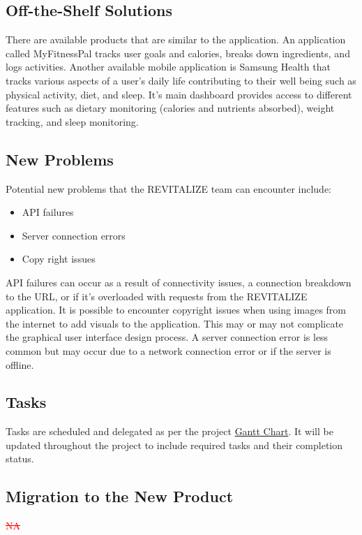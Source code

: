 \documentclass[12pt,letterpaper]{article}
\begin{document}
\subsection{Off-the-Shelf Solutions}
There are available products that are similar to the application. An application called MyFitnessPal tracks user goals and calories, breaks down ingredients, and logs activities. Another available mobile application is Samsung Health that tracks various aspects of a user's daily life contributing to their well being such as physical activity, diet, and sleep. It's main dashboard provides access to different features such as dietary monitoring (calories and nutrients absorbed), weight tracking, and sleep monitoring. 

\subsection{New Problems}
Potential new problems that the REVITALIZE team can encounter include:
\begin{itemize}
	\item API failures
	\item Server connection errors
	\item Copy right issues
\end{itemize}
API failures can occur as a result of connectivity issues, a connection breakdown to the URL, or if it's overloaded with requests from the REVITALIZE application. It is possible to encounter copyright issues when using images from the internet to add visuals to the application. This may or may not complicate the graphical user interface design process. A server connection error is less common but may occur due to a network connection error or if the server is offline.

\subsection{Tasks}
Tasks are scheduled and delegated as per the project \href{https://github.com/BillNguyen1999/REVITALIZE/blob/main/projectschedule/REVITALIZE.pdf}{\color{blue}Gantt Chart}. It will be updated throughout the project to include required tasks and their completion status.

\subsection{Migration to the New Product}
\textcolor{red}{\sout{NA}}
\end{document}
